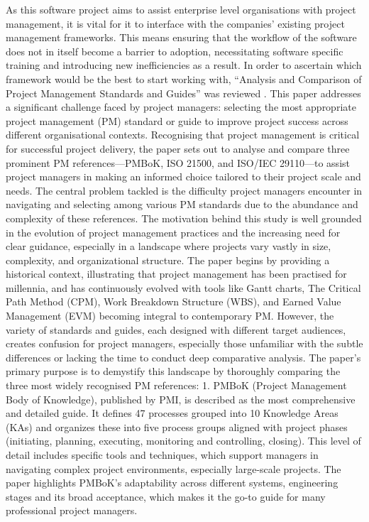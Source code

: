 \documentclass{report}
\begin{document}
As this software project aims to assist enterprise level organisations with project management, it is vital for it to interface with the companies’ existing project management frameworks. This means ensuring that the workflow of the software does not in itself become a barrier to adoption, necessitating software specific training and introducing new inefficiencies as a result. 
In order to ascertain which framework would be the best to start working with,  “Analysis and Comparison of Project Management Standards and Guides” was reviewed \parencite{xueAnalysisComparisonProject}. This paper addresses a significant challenge faced by project managers: selecting the most appropriate project management (PM) standard or guide to improve project success across different organisational contexts. Recognising that project management is critical for successful project delivery, the paper sets out to analyse and compare three prominent PM references—PMBoK, ISO 21500, and ISO/IEC 29110—to assist project managers in making an informed choice tailored to their project scale and needs. The central problem tackled is the difficulty project managers encounter in navigating and selecting among various PM standards due to the abundance and complexity of these references.
The motivation behind this study is well grounded in the evolution of project management practices and the increasing need for clear guidance, especially in a landscape where projects vary vastly in size, complexity, and organizational structure. The paper begins by providing a historical context, illustrating that project management has been practised for millennia, and has continuously evolved with tools like Gantt charts, The Critical Path Method (CPM), Work Breakdown Structure (WBS), and Earned Value Management (EVM) becoming integral to contemporary PM. However, the variety of standards and guides, each designed with different target audiences, creates confusion for project managers, especially those unfamiliar with the subtle differences or lacking the time to conduct deep comparative analysis.
The paper’s primary purpose is to demystify this landscape by thoroughly comparing the three most widely recognised PM references:
    1. PMBoK (Project Management Body of Knowledge), published by PMI, is described as the most comprehensive and detailed guide. It defines 47 processes grouped into 10 Knowledge Areas (KAs) and organizes these into five process groups aligned with project phases (initiating, planning, executing, monitoring and controlling, closing). This level of detail includes specific tools and techniques, which support managers in navigating complex project environments, especially large-scale projects. The paper highlights PMBoK’s adaptability across different systems, engineering stages and its broad acceptance, which makes it the go-to guide for many professional project managers.
\end{document}
